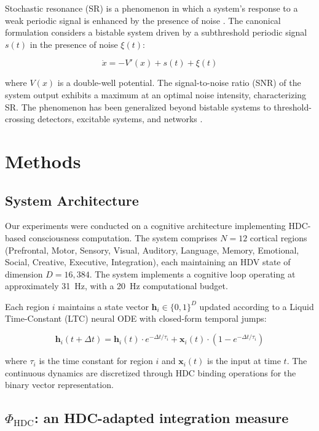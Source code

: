 \documentclass[12pt,a4paper]{article}
\begin{document}
Stochastic resonance (SR) is a phenomenon in which a system's response to a weak periodic signal is enhanced by the presence of noise \citep{gammaitoni1998stochastic}. The canonical formulation considers a bistable system driven by a subthreshold periodic signal $s(t)$ in the presence of noise $\xi(t)$:

\begin{equation}
\dot{x} = -V'(x) + s(t) + \xi(t)
\end{equation}

where $V(x)$ is a double-well potential. The signal-to-noise ratio (SNR) of the system output exhibits a maximum at an optimal noise intensity, characterizing SR. The phenomenon has been generalized beyond bistable systems to threshold-crossing detectors, excitable systems, and networks \citep{mcdonnell2011benefits}.

\section{Methods}

\subsection{System Architecture}

Our experiments were conducted on a cognitive architecture implementing HDC-based consciousness computation. The system comprises $N = 12$ cortical regions (Prefrontal, Motor, Sensory, Visual, Auditory, Language, Memory, Emotional, Social, Creative, Executive, Integration), each maintaining an HDV state of dimension $D = 16{,}384$. The system implements a cognitive loop operating at approximately 31~Hz, with a 20~Hz computational budget.

Each region $i$ maintains a state vector $\mathbf{h}_i \in \{0, 1\}^D$ updated according to a Liquid Time-Constant (LTC) neural ODE with closed-form temporal jumps:

\begin{equation}
\mathbf{h}_i(t + \Delta t) = \mathbf{h}_i(t) \cdot e^{-\Delta t / \tau_i} + \mathbf{x}_i(t) \cdot (1 - e^{-\Delta t / \tau_i})
\end{equation}

where $\tau_i$ is the time constant for region $i$ and $\mathbf{x}_i(t)$ is the input at time $t$. The continuous dynamics are discretized through HDC binding operations for the binary vector representation.

\subsection{$\Phi_{\text{HDC}}$: an HDC-adapted integration measure}
\label{sec:phi-hdc}
\end{document}
